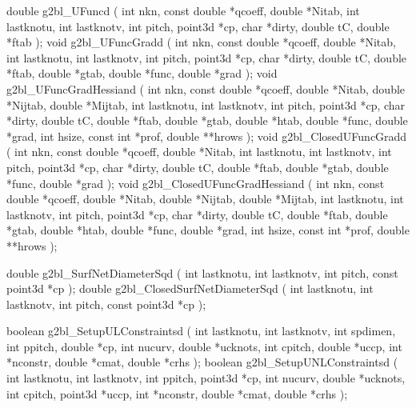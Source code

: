 \medskip
\begin{listingC}
double g2bl_UFuncd ( int nkn, const double *qcoeff, double *Nitab,
                 int lastknotu, int lastknotv, int pitch, point3d *cp,
                 char *dirty,
                 double tC, double *ftab );
void g2bl_UFuncGradd ( int nkn, const double *qcoeff, double *Nitab,
                       int lastknotu, int lastknotv,
                       int pitch, point3d *cp, char *dirty,
                       double tC, double *ftab, double *gtab,
                       double *func, double *grad );
void g2bl_UFuncGradHessiand (
                  int nkn, const double *qcoeff, double *Nitab,
                  double *Nijtab, double *Mijtab,
                  int lastknotu, int lastknotv,  
                  int pitch, point3d *cp, char *dirty,
                  double tC, double *ftab, double *gtab, double *htab,
                  double *func, double *grad,
                  int hsize, const int *prof, double **hrows );
void g2bl_ClosedUFuncGradd (
                  int nkn, const double *qcoeff, double *Nitab, 
                  int lastknotu, int lastknotv,
                  int pitch, point3d *cp, char *dirty,
                  double tC, double *ftab, double *gtab,
                  double *func, double *grad );
void g2bl_ClosedUFuncGradHessiand (
                  int nkn, const double *qcoeff, double *Nitab,
                  double *Nijtab, double *Mijtab,
                  int lastknotu, int lastknotv,  
                  int pitch, point3d *cp, char *dirty,
                  double tC, double *ftab, double *gtab, double *htab,
                  double *func, double *grad,
                  int hsize, const int *prof, double **hrows );
\end{listingC}

\medskip
\begin{listingC}
double g2bl_SurfNetDiameterSqd ( int lastknotu, int lastknotv,
                                 int pitch, const point3d *cp );
double g2bl_ClosedSurfNetDiameterSqd ( int lastknotu, int lastknotv,
                                       int pitch, const point3d *cp );
\end{listingC}

\medskip
\begin{listingC}
boolean g2bl_SetupULConstraintsd (
                   int lastknotu, int lastknotv, int spdimen,
                   int ppitch, double *cp,
                   int nucurv, double *ucknots,
                   int cpitch, double *uccp,   
                   int *nconstr, double *cmat, double *crhs );
boolean g2bl_SetupUNLConstraintsd ( int lastknotu, int lastknotv,
                   int ppitch, point3d *cp,
                   int nucurv, double *ucknots,
                   int cpitch, point3d *uccp,  
                   int *nconstr, double *cmat, double *crhs );
\end{listingC}

